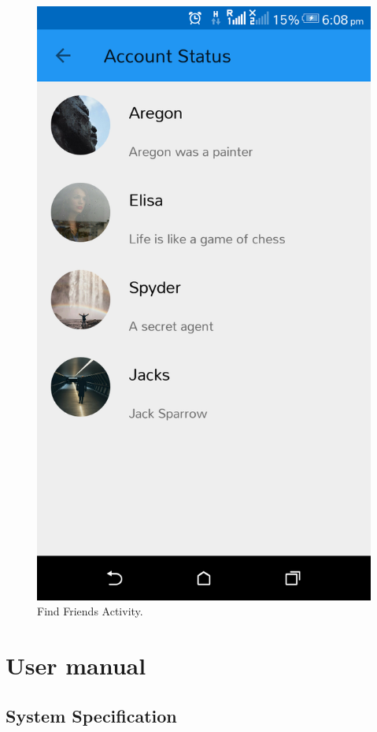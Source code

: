 \begin{appendices}
\begin{figure}[!ht]
	\centering
	\includegraphics[scale=0.2]{all-user.png}
	\caption{\label{img25}  Find Friends Activity.}
\end{figure}


\chapter{User manual}
\section{System Specification}

\end{appendices}
